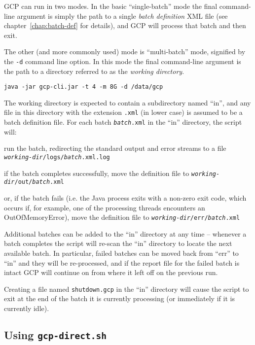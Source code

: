 GCP can run in two modes.  In the basic ``single-batch'' mode the final
command-line argument is simply the path to a single {\em batch definition} XML
file (see chapter~\ref{chap:batch-def} for details), and GCP will process that
batch and then exit.

The other (and more commonly used) mode is ``multi-batch'' mode, signified by
the \verb!-d! command line option.  In this mode the final command-line
argument is the path to a directory referred to as the {\em working directory}.
\begin{verbatim}
java -jar gcp-cli.jar -t 4 -m 8G -d /data/gcp
\end{verbatim}

The working directory is expected to contain a subdirectory named ``in'', and
any file in this directory with the extension \verb!.xml! (in lower case) is
assumed to be a batch definition file.  For each batch {\tt {\it batch}.xml} in
the ``in'' directory, the script will:

\bit
\item run the batch, redirecting the standard output and error streams to a
  file {\tt {\it working-dir}/logs/{\it batch}.xml.log}
\item if the batch completes successfully, move the definition file to
  {\tt {\it working-dir}/out/{\it batch}.xml}
\item or, if the batch fails (i.e. the Java process exits with a non-zero exit
  code, which occurs if, for example, one of the processing threads encounters
  an OutOfMemoryError), move the definition file to
  {\tt {\it working-dir}/err/{\it batch}.xml}
\eit

Additional batches can be added to the ``in'' directory at any time -- whenever
a batch completes the script will re-scan the ``in'' directory to locate the
next available batch.  In particular, failed batches can be moved back from
``err'' to ``in'' and they will be re-processed, and if the report file for the
failed batch is intact GCP will continue on from where it left off on the
previous run.

Creating a file named \verb!shutdown.gcp! in the ``in'' directory will cause
the script to exit at the end of the batch it is currently processing (or
immediately if it is currently idle).


\subsection{Using {\tt gcp-direct.sh}}
\label{sec:running:gcp-direct}

